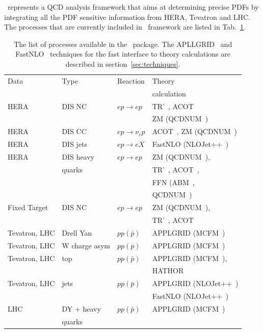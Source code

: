 \fitter~represents a QCD analysis framework that aims at 
determining precise PDFs by integrating all the PDF sensitive information
from HERA, Tevatron and LHC.
%
The processes that are currently included in \fitter~framework are listed in Tab.~\ref{tab:proc}.
%
\begin{table}
\small
\scriptsize

\begin{tabular}{|l|l|l|l|}
\hline
Data &Type &  Reaction & Theory      \\
        &     &     & calculation \\
\hline

HERA &DIS NC   &$ep\to ep$      & TR'~\cite{Thorne:1997ga,Thorne:2006qt,MSTWpdf,Thorne:6180}, ACOT~\cite{CWZ} \\
     &         &                & ZM (QCDNUM~\cite{qcdnum}) \\
HERA &DIS CC   &$ep\to \nu_e p$ & ACOT~\cite{CWZ}, ZM (QCDNUM~\cite{qcdnum}) \\
HERA &DIS jets &$ep\to eX$      & FastNLO (NLOJet++~\cite{Nagy:1998bb,Nagy:2001fj})\\
HERA &DIS heavy                 & $ep\to ep $& ZM (QCDNUM~\cite{qcdnum}), \\
     & quarks  &                & TR'~\cite{Thorne:1997ga,Thorne:2006qt,MSTWpdf,Thorne:6180}, ACOT~\cite{CWZ}, \\
     &         &                & FFN (ABM~\cite{Alekhin:runm,openqcdrad:page}, \\
     &         &                & QCDNUM~\cite{qcdnum}) \\
\hline
Fixed Target   &DIS NC          &$ep\to ep$ & ZM (QCDNUM~\cite{qcdnum}), \\
     &         &                & TR'~\cite{Thorne:1997ga,Thorne:2006qt,MSTWpdf,Thorne:6180}, ACOT~\cite{CWZ} \\
\hline
Tevatron, LHC &Drell Yan &$pp(\bar p)$ & APPLGRID (MCFM~\cite{Campbell:1999ah,Campbell:2000je,Campbell:2010ff}) \\
Tevatron, LHC &W charge asym &$pp(\bar p)$ & APPLGRID (MCFM~\cite{Campbell:1999ah,Campbell:2000je,Campbell:2010ff}) \\
Tevatron, LHC &top &$pp(\bar p)$  & APPLGRID (MCFM~\cite{Campbell:1999ah,Campbell:2000je,Campbell:2010ff}),  \\
              &    &              & HATHOR~\cite{Aliev:2010zk} \\
Tevatron, LHC &jets &$pp(\bar p)$ & APPLGRID (NLOJet++~\cite{Nagy:1998bb,Nagy:2001fj}) \\
                &  & & FastNLO (NLOJet++~\cite{Nagy:1998bb,Nagy:2001fj}) \\
LHC& DY + heavy &$pp(\bar p)$ & APPLGRID (MCFM~\cite{Campbell:1999ah,Campbell:2000je,Campbell:2010ff}) \\
   & quarks     &                 & \\
\hline
\end{tabular}
\caption{The list of processes available in the \fitter~package. 
The APLLGRID~\cite{Carli:2010rw} and FastNLO~\cite{Kluge:2006xs,Wobisch:2011ij,Britzger:2012bs} 
techniques for the fast interface to theory calculations are described in section~\ref{sec:techniques}.} 
\label{tab:proc}
\end{table}
